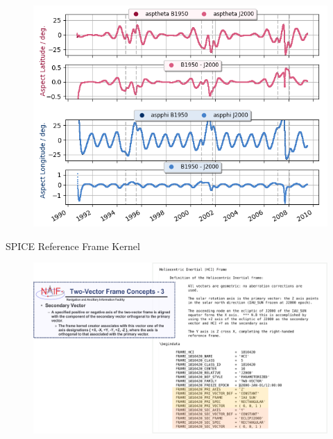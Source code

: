 \documentclass{beamer}
\begin{document}
\begin{frame}{}
\begin{figure}
	\includegraphics[scale=0.7]{Pics/AA_vergleich_new.png}
\end{figure}
\end{frame}

\begin{frame}{SPICE Reference Frame Kernel}
\flushleft
\begin{figure}								
	\includegraphics[width=1.1\textwidth]{Pics/kernel_instruction.png}
\end{figure}
\end{frame}


%
%
\end{document}
